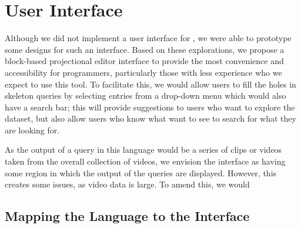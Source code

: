 
\section{User Interface}
Although we did not implement a user interface for , we were able to prototype some designs for such an interface. Based on these explorations, we propose a block-based projectional editor interface to provide the most convenience and accessibility for programmers, particularly those with less experience who we expect to use this tool. To facilitate this, we would allow users to fill the holes in skeleton queries by selecting entries from a drop-down menu which would also have a search bar; this will provide suggestions to users who want to explore the dataset, but also allow users who know what want to see to search for what they are looking for.  

As the output of a query in this language would be a series of clips or videos taken from the overall collection of videos, we envision the interface as having some region in which the output of the queries are displayed. However, this creates some issues, as video data is large. To amend this, we would 

\subsection{Mapping the Language to the Interface}


 \\
 \\
